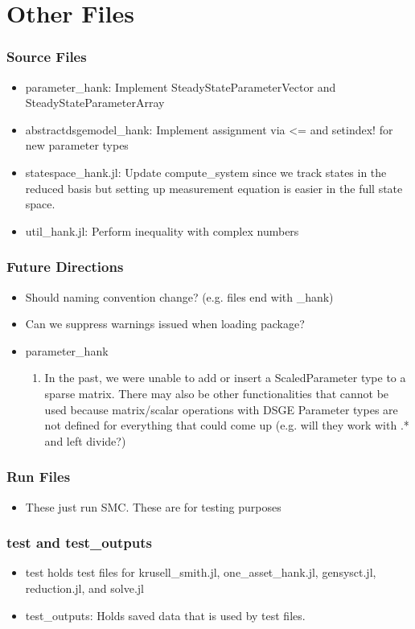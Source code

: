 \documentclass{beamer}
\begin{document}
\section{Other Files}
\begin{frame}
\frametitle{Source Files}
\begin{itemize}
\item parameter\_hank: Implement SteadyStateParameterVector and SteadyStateParameterArray
\item abstractdsgemodel\_hank: Implement assignment via <= and setindex! for new parameter types
\item statespace\_hank.jl: Update compute\_system since we track states in the reduced basis but setting up measurement equation is easier in the full state space.
\item util\_hank.jl: Perform inequality with complex numbers
\end{itemize}
\end{frame}

\begin{frame}
  \frametitle{Future Directions}
\begin{itemize}
\item Should naming convention change? (e.g. files end with \_hank)
\item Can we suppress warnings issued when loading package?
\item parameter\_hank
  \begin{enumerate}
  \item In the past, we were unable to add or insert a ScaledParameter type to a sparse matrix. There may also be other functionalities that cannot be used because matrix/scalar operations with DSGE Parameter types are not defined for everything that could come up (e.g. will they work with .* and left divide?)
  \end{enumerate}
\end{itemize}
\end{frame}

\begin{frame}
\frametitle{Run Files}
\begin{itemize}
\item These just run SMC. These are for testing purposes
\end{itemize}
\end{frame}

\begin{frame}
  \frametitle{test and test\_outputs}
\begin{itemize}
\item test holds test files for krusell\_smith.jl, one\_asset\_hank.jl, gensysct.jl, reduction.jl, and solve.jl
\item test\_outputs: Holds saved data that is used by test files.
\end{itemize}
\end{frame}
\end{document}
